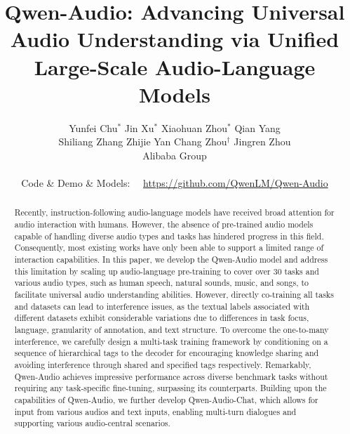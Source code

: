 \documentclass{article}
\title{
\textbf{
Qwen-Audio: Advancing Universal Audio Understanding via Unified Large-Scale Audio-Language Models}
}
\author{
\large{}
Yunfei Chu$^*$ \hspace{6mm} Jin Xu$^*$ \hspace{6mm} Xiaohuan Zhou$^*$ \hspace{6mm} Qian Yang\\
Shiliang Zhang \hspace{6mm} Zhijie Yan \hspace{6mm} Chang Zhou$^{\dag}$ \hspace{6mm} Jingren Zhou
\\
\large{}
Alibaba Group
\\
\\
\small{}
Code \& Demo \& Models: \ \ \url{https://github.com/QwenLM/Qwen-Audio}
}
\date{}
\begin{document}
\doparttoc %
\faketableofcontents %

\maketitle

\begin{abstract}
\noindent
Recently, instruction-following audio-language models have received broad attention for audio interaction with humans.
However, the absence of pre-trained audio models capable of handling diverse audio types and tasks has hindered progress in this field. Consequently, most existing works have only been able to support a limited range of interaction capabilities. In this paper, we develop the Qwen-Audio model and address this limitation by scaling up audio-language pre-training to cover over 30 tasks and various audio types, such as human speech, natural sounds, music, and songs, to facilitate universal audio understanding abilities. 
However, directly co-training all tasks and datasets can lead to interference issues, as the textual labels associated with different datasets exhibit considerable variations due to differences in task focus, language, granularity of annotation, and text structure. 
To overcome the one-to-many interference, we carefully design a multi-task training framework by conditioning on a sequence of hierarchical tags to the decoder for encouraging knowledge sharing and avoiding interference through shared and specified tags respectively. Remarkably, Qwen-Audio achieves impressive performance across diverse benchmark tasks without requiring any task-specific fine-tuning, surpassing its counterparts. Building upon the capabilities of Qwen-Audio, we further develop Qwen-Audio-Chat, which allows for input from various audios and text inputs, enabling multi-turn dialogues and supporting various audio-central scenarios.


\end{abstract}


{\let\thefootnote\relax{}}
\end{document}
